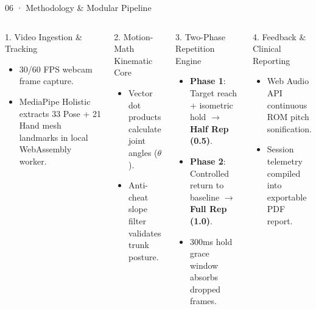 \documentclass[aspectratio=169,11pt]{beamer}
\begin{document}
\begin{frame}{06 · Methodology \& Modular Pipeline}
\begin{columns}[T]
\begin{block}{1. Video Ingestion \& Tracking}
\begin{itemize}
    \setlength{\itemsep}{1pt}
    \item 30/60 FPS webcam frame capture.
    \item MediaPipe Holistic extracts 33 Pose + 21 Hand mesh landmarks in local WebAssembly worker.
\end{itemize}
\end{block}

\vspace{2mm}
\begin{block}{2. Motion-Math Kinematic Core}
\begin{itemize}
    \setlength{\itemsep}{1pt}
    \item Vector dot products calculate joint angles ($\theta$).
    \item Anti-cheat slope filter validates trunk posture.
\end{itemize}
\end{block}

\begin{block}{3. Two-Phase Repetition Engine}
\begin{itemize}
    \setlength{\itemsep}{1pt}
    \item \textbf{Phase 1}: Target reach + isometric hold $\rightarrow$ \textbf{Half Rep (0.5)}.
    \item \textbf{Phase 2}: Controlled return to baseline $\rightarrow$ \textbf{Full Rep (1.0)}.
    \item 300ms hold grace window absorbs dropped frames.
\end{itemize}
\end{block}

\vspace{2mm}
\begin{block}{4. Feedback \& Clinical Reporting}
\begin{itemize}
    \setlength{\itemsep}{1pt}
    \item Web Audio API continuous ROM pitch sonification.
    \item Session telemetry compiled into exportable PDF report.
\end{itemize}
\end{block}
\end{columns}
\end{frame}
\end{document}
